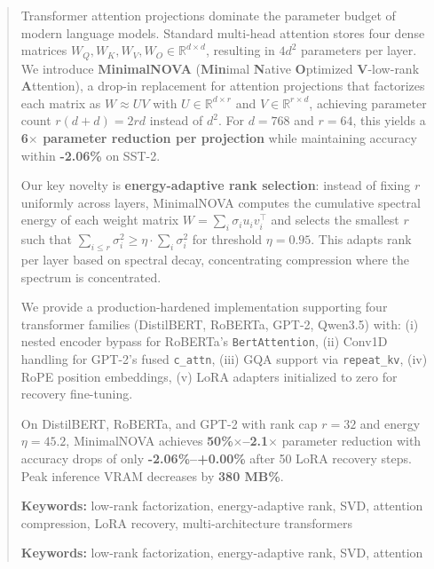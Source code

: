 \documentclass{article}
\begin{document}
\maketitle

\begin{abstract}
Transformer attention projections dominate the parameter budget of modern 
language models. Standard multi-head attention stores four dense matrices 
$W_Q, W_K, W_V, W_O \in \mathbb{R}^{d \times d}$, resulting in $4d^2$ parameters 
per layer. We introduce \textbf{MinimalNOVA} (\textbf{Min}imal \textbf{N}ative \textbf{O}ptimized 
\textbf{V}-low-rank \textbf{A}ttention), a drop-in replacement for attention projections 
that factorizes each matrix as $W \approx U V$ with $U \in \mathbb{R}^{d \times r}$ 
and $V \in \mathbb{R}^{r \times d}$, achieving parameter count 
$r(d + d) = 2rd$ instead of $d^2$. For $d = 768$ and $r = 64$, this yields a 
\textbf{6$\times$ parameter reduction per projection} while maintaining accuracy within 
\textbf{-2.06\%} on SST-2.

Our key novelty is \textbf{energy-adaptive rank selection}: instead of fixing 
$r$ uniformly across layers, MinimalNOVA computes the cumulative spectral 
energy of each weight matrix $W = \sum_i \sigma_i u_i v_i^\top$ and selects 
the smallest $r$ such that $\sum_{i \le r} \sigma_i^2 \geq \eta \cdot \sum_i \sigma_i^2$ 
for threshold $\eta = 0.95$. This adapts rank per layer based on spectral 
decay, concentrating compression where the spectrum is concentrated.

We provide a production-hardened implementation supporting four transformer 
families (DistilBERT, RoBERTa, GPT-2, Qwen3.5) with:
(i) nested encoder bypass for RoBERTa's \texttt{BertAttention},
(ii) Conv1D handling for GPT-2's fused \texttt{c\_attn},
(iii) GQA support via \texttt{repeat\_kv},
(iv) RoPE position embeddings,
(v) LoRA adapters initialized to zero for recovery fine-tuning.

On DistilBERT, RoBERTa, and GPT-2 with rank cap $r = 32$ and energy 
$\eta = 45.2$, MinimalNOVA achieves \textbf{50\%$\times$--2.1$\times$} 
parameter reduction with accuracy drops of only \textbf{-2.06\%--+0.00\%} 
after 50 LoRA recovery steps. Peak inference VRAM decreases 
by \textbf{380 MB\%}.

\textbf{Keywords:} low-rank factorization, energy-adaptive rank, SVD, attention 
compression, LoRA recovery, multi-architecture transformers



\vspace{0.5em}
\noindent\textbf{Keywords:} low-rank factorization, energy-adaptive rank, SVD, attention
\end{abstract}
\end{document}
